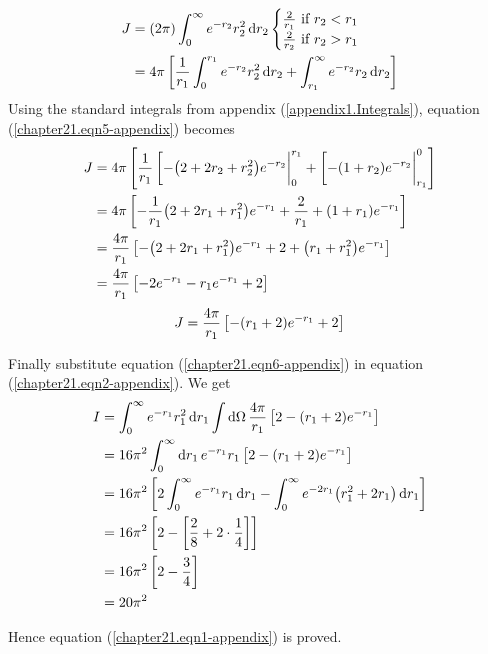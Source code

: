 	\begin{align*}
		J &= \qty(2 \pi) \int_{0}^{\infty} e^{-r_2} r_2^2 \dd{r_2} \begin{cases}
			\frac{2}{r_1} \ \text{if} \ r_2 < r_1 \\
			\frac{2}{r_2} \ \text{if} \ r_2 > r_1
		\end{cases}\\
		&= 4\pi \left[
		\frac{1}{r_1} \int_{0}^{r_1} e^{-r_2} r_2^2 \dd{r_2} + \int_{r_1}^{\infty} e^{-r_2} r_2 \dd{r_2}
		\right]
		\label{chapter21.eqn5-appendix}
	\end{align*}
	Using the standard integrals from appendix (\ref{appendix1.Integrals}), equation (\ref{chapter21.eqn5-appendix}) becomes
	\begin{align*}
		J &= 4 \pi \left[
		\frac{1}{r_1} \eval[-\qty(2 + 2 r_2 + r_2^2) e^{-r_2}|_{0}^{r_1} + \eval[-\qty( 1 + r_2) e^{-r_2}|_{r_1}^{0}
		\right]\\
		&= 4\pi \left[
		-\frac{1}{r_1} \qty(2 + 2 r_1 + r_1^2) e^{-r_1}
		+ \frac{2}{r_1} + \qty(1 + r_1) e^{-r_1}
		\right] \\
		&= \frac{4\pi}{r_1} \left[
		- \qty(2 + 2 r_1 + r_1^2) e^{-r_1}
		+ 2 + \qty(r_1 + r_1^2) e^{-r_1}
		\right] \\
		&= \frac{4\pi}{r_1} \left[
		-2 e^{-r_1} - r_1 e^{-r_1} + 2
		\right]
	\end{align*}
	\begin{equation}
		J = \frac{4\pi}{r_1} \left[
		-\qty(r_1  +  2) e^{-r_1} + 2
		\right]
		\label{chapter21.eqn6-appendix}
	\end{equation}
	
	Finally substitute equation (\ref{chapter21.eqn6-appendix}) in equation (\ref{chapter21.eqn2-appendix}). We get
	\begin{align*}
		I 
		&= \int_{0}^{\infty} e^{-r_1} r_1^2 \dd{r_1} \int \dd{\Omega} \frac{4\pi}{r_1} \left[2 - \qty(r_1 + 2) e ^{-r_1} \right]\\
		&= 16 \pi^2 \int_{0}^{\infty} \dd{r_1} e^{-r_1} r_1 \left[2 - \qty(r_1 + 2)e^{-r_1}\right] \\
		&= 16\pi^2 \left[
		2 \int_{0}^{\infty} e^{-r_1} r_1 \dd{r_1}
		- \int_{0}^{\infty} e^{-2 r_1} \qty(r_1^2 + 2 r_1) \dd{r_1}
		\right]\\
		&= 16 \pi^2 \left[2 - \left[\frac{2}{8} + 2 \cdot \frac{1}{4}\right]\right] \\
		&= 16 \pi^2 \left[2 - \frac{3}{4}\right] \\
		&= 20 \pi^2
	\end{align*}
	
	Hence equation (\ref{chapter21.eqn1-appendix}) is proved.